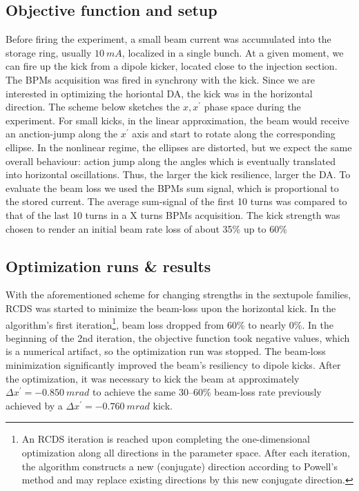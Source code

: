 \subsection{Objective function and setup}
Before firing the experiment, a small beam current was accumulated into the storage ring, usually $10~\unit{mA}$, localized in a single bunch. At a given moment, we can fire up the kick from a dipole kicker, located close to the injection section. The BPMs acquisition was fired in synchrony with the kick. Since we are interested in optimizing the horiontal DA, the kick was in the horizontal direction. The scheme below sketches the $x,x^\prime$ phase space during the experiment. For small kicks, in the linear approximation, the beam would receive an anction-jump along the $x^\prime$ axis and start to rotate along the corresponding ellipse. In the nonlinear regime, the ellipses are distorted, but we expect the same overall behaviour: action jump along the angles which is eventually translated into horizontal oscillations. Thus, the larger the kick resilience, larger the DA.
To evaluate the beam loss we used the BPMs sum signal, which is proportional to the stored current. The average sum-signal of the first 10 turns was compared to that of the last 10 turns in a X turns BPMs acquisition. The kick strength was chosen to render an initial beam rate loss of about 35\% up to 60\%
\subsection{Optimization runs \& results}
With the aforementioned scheme for changing strengths in the sextupole families, RCDS was started to minimize the beam-loss upon the horizontal kick. In the algorithm's first iteration\footnote{An RCDS iteration is reached upon completing the one-dimensional optimization along all directions in the parameter space. After each iteration, the algorithm constructs a new (conjugate) direction according to Powell's method and may replace existing directions by this new conjugate direction.}, beam loss dropped from 60\% to nearly 0\%. In the beginning of the 2nd iteration, the objective function took negative values, which is a numerical artifact, so the optimization run was stopped. The beam-loss minimization significantly improved the beam's resiliency to dipole kicks. After the optimization, it was necessary to kick the beam at approximately $\Delta x^\prime=-0.850~\unit{m rad}$ to achieve the same  30--60\% beam-loss rate previously achieved by a $\Delta x^\prime=-0.760~\unit{m rad}$ kick.

